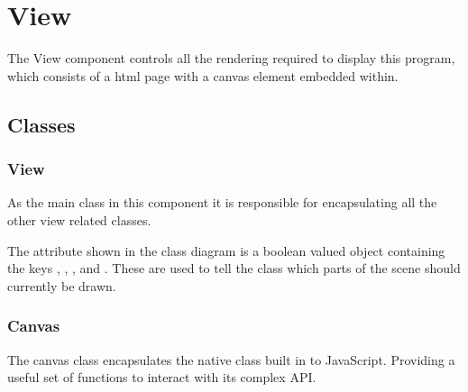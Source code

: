 \section{View}

    The View component controls all the rendering required to display this program, which consists of a html page with a canvas element embedded within.

    \subsection{Classes}

        \subsubsection{View}

            As the main class in this component it is responsible for encapsulating all the other view related classes.

            The  attribute shown in the class diagram is a boolean valued object containing the keys , , ,  and . These are used to tell the class which parts of the scene should currently be drawn.


        \subsubsection{Canvas}

            The canvas class encapsulates the native  class built in to JavaScript. Providing a useful set of functions to interact with its complex API.


